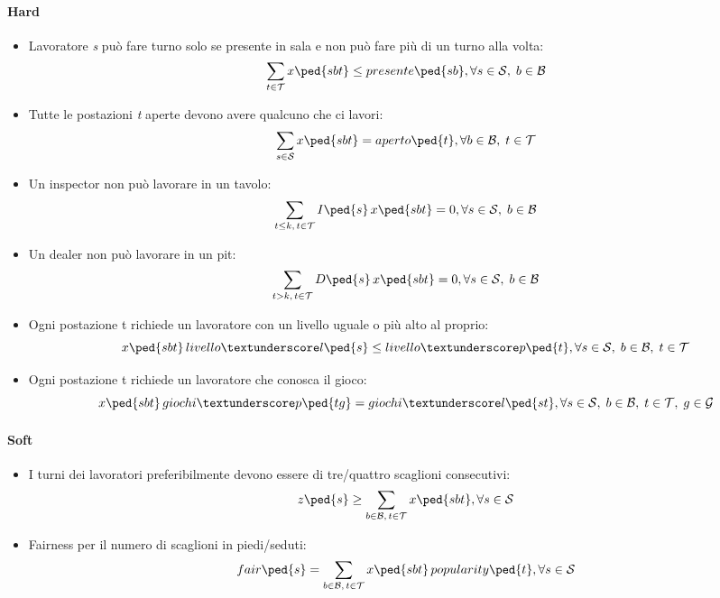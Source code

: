 \paragraph{Hard}
\begin{itemize}
    \item Lavoratore \textit{s} può fare turno solo se presente in sala e non può fare più di un turno alla volta:
    \[\sum_{t \in \mathcal{T}} x\ped{sbt} \le presente\ped{sb}, \forall s \in \mathcal{S},\; b \in \mathcal{B} \]
    \item Tutte le postazioni \textit{t} aperte devono avere qualcuno che ci lavori:
    \[\sum_{s \in \mathcal{S}} x\ped{sbt} = aperto\ped{t}, \forall b \in \mathcal{B},\; t \in \mathcal{T} \]
    \item Un inspector non può lavorare in un tavolo:
    \[\sum_{t \le k, \, t \in \mathcal{T}} I\ped{s} \, x\ped{sbt} = 0, \forall s \in \mathcal{S},\; b \in \mathcal{B} \]
    \item Un dealer non può lavorare in un pit:
    \[\sum_{t > k, \, t \in \mathcal{T}} D\ped{s} \, x\ped{sbt} = 0,\forall s \in \mathcal{S},\; b \in \mathcal{B} \]
    \item Ogni postazione t richiede un lavoratore con un livello uguale o più alto al proprio:
    \[x\ped{sbt} \, livello\textunderscore l\ped{s} \le livello\textunderscore p\ped{t}, \forall s \in \mathcal{S},\; b \in \mathcal{B},\; t \in \mathcal{T} \]
    \item Ogni postazione t richiede un lavoratore che conosca il gioco:
    \[x\ped{sbt} \, giochi\textunderscore p\ped{tg} = giochi\textunderscore l\ped{st}, \forall s \in \mathcal{S},\; b \in \mathcal{B},\; t \in \mathcal{T},\; g \in \mathcal{G} \] 
\end{itemize}
\paragraph{Soft}
\begin{itemize}
    \item I turni dei lavoratori preferibilmente devono essere di tre/quattro scaglioni consecutivi:
    \[z\ped{s} \ge \sum_{b \in \mathcal{B},\, t \in \mathcal{T}}x\ped{sbt}, \forall s \in \mathcal{S} \]
    \item Fairness per il numero di scaglioni in piedi/seduti:
    \[fair\ped{s} = \sum_{b \in \mathcal{B},\, t \in \mathcal{T}}x\ped{sbt} \, popularity\ped{t}, \forall s \in \mathcal{S}\]
\end{itemize}
